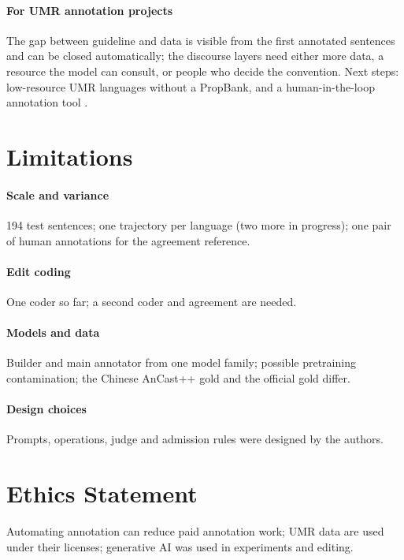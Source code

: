 \documentclass[11pt]{article}
\begin{document}
\paragraph{For UMR annotation projects}
The gap between guideline and data is visible from the first annotated sentences and can be closed automatically; the discourse layers need either more data, a resource the model can consult, or people who decide the convention. Next steps: low-resource UMR languages without a PropBank, and a human-in-the-loop annotation tool \citep{anon2026orchestration}.

\section*{Limitations}

\paragraph{Scale and variance}
194 test sentences; one trajectory per language (two more in progress); one pair of human annotations for the agreement reference.

\paragraph{Edit coding}
One coder so far; a second coder and agreement are needed.

\paragraph{Models and data}
Builder and main annotator from one model family; possible pretraining contamination; the Chinese AnCast++ gold and the official gold differ.

\paragraph{Design choices}
Prompts, operations, judge and admission rules were designed by the authors.

\section*{Ethics Statement}
Automating annotation can reduce paid annotation work; UMR data are used under their licenses; generative AI was used in experiments and editing.


\end{document}

